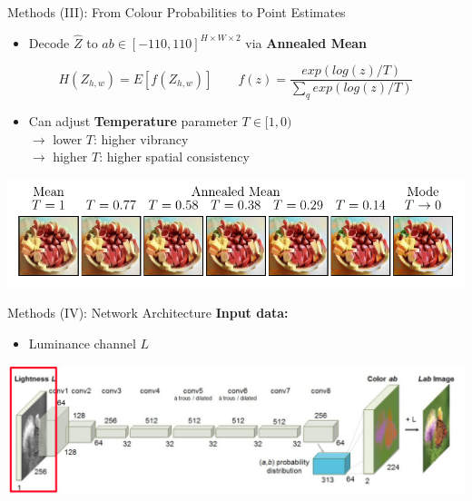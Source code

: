\documentclass{beamer}
\begin{document}
\begin{frame}{Methods (III): From Colour Probabilities to Point Estimates}
  \begin{itemize}
    \item Decode $\hat{Z}$ to $ab \in [-110,110]^{H \times W \times 2}$ via \textbf{Annealed Mean}
  \end{itemize}

  \begin{equation}
    H(Z_{h,w}) = E[f(Z_{h,w})] \qquad f(z) = \frac{exp(log(z)/T)}{\sum_q exp(log(z)/T)}
  \end{equation}

  \begin{itemize}
    \item Can adjust \textbf{Temperature} parameter $T \in [1, 0)$ \\
          $\rightarrow$ lower $T$: higher vibrancy \\
          $\rightarrow$ higher $T$: higher spatial consistency
  \end{itemize}

  \medskip

  \includegraphics[width=\linewidth]{resources/annealed_mean.pdf}
\end{frame}

\begin{frame}{Methods (IV): Network Architecture}
  \textbf{Input data:}
    \begin{itemize}
       \item Luminance channel $L$
    \end{itemize}

  \medskip

  \includegraphics[width=\linewidth]{resources/network1.jpg}
\end{frame}
\end{document}
